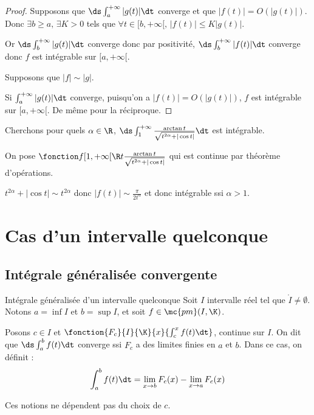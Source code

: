 \begin{proof}
    Supposons que $\ds \int_{a }^{+ \infty } |g(t)| \dt$ converge et que 
    $|f(t)| = O(|g(t)|)$. Donc $\exists b \geqslant a, \, \exists K > 0$ tels que 
    $\forall t \in [b, + \infty[, \, |f(t)| \leqslant K |g(t)|$.

    Or $\ds \int_{b }^{+ \infty   } |g(t)| \dt$ converge donc par positivité,
    $\ds \int_{b }^{+ \infty   } |f(t)| \dt$ converge donc $f$ est intégrable sur $[a, + \infty[$.


    \lvspace Supposons que $|f| \sim |g|$. 

    Si $\int_{a }^{+ \infty   } |g(t)| \dt$ converge, puisqu'on a $|f(t)| = O(|g(t)|)$,
    $f$ est intégrable sur $[a, + \infty[$. De même pour la réciproque.
\end{proof}

\begin{exemple}
    Cherchons pour quels $\alpha \in \R$, $\ds \int_1^{+ \infty} \frac{\arctan t}{\sqrt{t^{2 \alpha} + |\cos t|}} \dt$ est intégrable.


    On pose $\fonction f {[1, + \infty[}{\R}{t}{\frac{\arctan t}{\sqrt{t^{2 \alpha} + |\cos t|}}}$ qui est continue par théorème d'opérations.

    $t^{2 \alpha} + | \cos t | \sim t^{2 \alpha}$ donc $|f(t)| \sim \frac{\pi}{2 t^\alpha}$ et donc 
    intégrable ssi $\alpha > 1$.
\end{exemple}

\section{Cas d'un intervalle quelconque }
\subsection{Intégrale généralisée convergente }

\begin{definition}{Intégrale généralisée d'un intervalle quelconque}{}
    Soit $I$ intervalle réel tel que $\mathring I \neq \emptyset$. 
    Notons $a = \inf I$ et $b = \sup I$, et soit ${f \in \mc{pm}(I, \K)}$.

    Posons $c \in I$ et $\fonction{F_c}{I}{\K}{x}{\int_c^x f(t) \dt}$, continue sur $I$. 
    On dit que $\ds \int_{a }^{b } f(t) \dt$ converge ssi $F_c$ a des limites finies 
    en $a$ et $b$. Dans ce cas, on définit : 
    $$\int_a^b f(t) \dt = \lim_{x \to b} F_c(x) - \lim_{x \to a} F_c(x)$$

    Ces notions ne dépendent pas du choix de $c$.
\end{definition}

